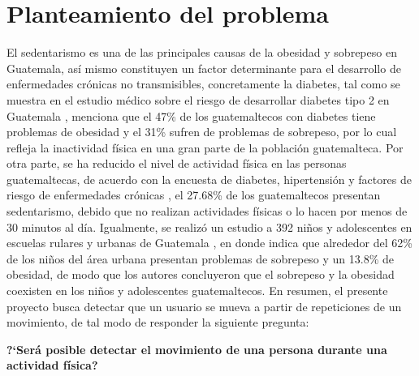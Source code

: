 \chapter{Planteamiento del problema}
El sedentarismo es una de las principales causas de la obesidad y sobrepeso en Guatemala, as\'i mismo constituyen un factor determinante para el desarrollo de enfermedades cr\'onicas no transmisibles, concretamente la diabetes, tal como se muestra en el estudio m\'edico sobre el riesgo de desarrollar diabetes tipo 2 en Guatemala  \cite{castro2017risk}, menciona que el 47\% de los guatemaltecos con diabetes tiene problemas de obesidad y el 31\%  sufren de problemas de sobrepeso, por lo cual refleja la inactividad f\'isica en una gran parte de la poblaci\'on guatemalteca.
\medbreak
Por otra parte, se ha reducido el nivel de actividad f\'isica en las personas guatemaltecas, de acuerdo con la encuesta de diabetes, hipertensi\'on y factores de riesgo de enfermedades cr\'onicas \cite{orellana2006organizacion}, el 27.68\% de los guatemaltecos presentan sedentarismo, debido que no realizan actividades f\'isicas o lo hacen por menos de 30 minutos al d\'ia.
\medbreak
Igualmente, se realiz\'o un estudio a 392 ni\~nos y adolescentes en escuelas rulares y urbanas de Guatemala \cite{muros2016doble}, en donde indica que alrededor del 62\% de los ni\~nos del  \'area urbana presentan problemas de sobrepeso y un 13.8\% de obesidad, de modo que los autores concluyeron que el sobrepeso y la obesidad coexisten en los ni\~nos y adolescentes guatemaltecos.
\medbreak
En resumen, el presente proyecto busca detectar que un usuario se mueva a partir de repeticiones de un movimiento, de tal modo de responder la siguiente pregunta:
\medbreak
\begin{center}
\textbf{?`Ser\'a posible detectar el movimiento de una persona durante una actividad f\'isica?}
\end{center}





